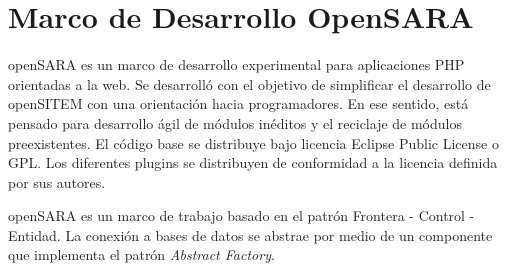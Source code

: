 \section{Marco de Desarrollo OpenSARA}

openSARA es un marco de desarrollo experimental para aplicaciones PHP orientadas a la web. Se desarrolló con el objetivo de simplificar el desarrollo de openSITEM con una orientación hacia programadores. En ese sentido, está pensado para desarrollo ágil de módulos inéditos y el reciclaje de módulos preexistentes. El código base se distribuye bajo licencia Eclipse Public License o GPL. Los diferentes plugins se distribuyen de conformidad a la licencia definida por sus autores. 

openSARA es un marco de trabajo basado en el patrón Frontera - Control - Entidad. La conexión a bases de datos se abstrae por medio de un componente que implementa el patrón \textit{Abstract Factory}. 	 